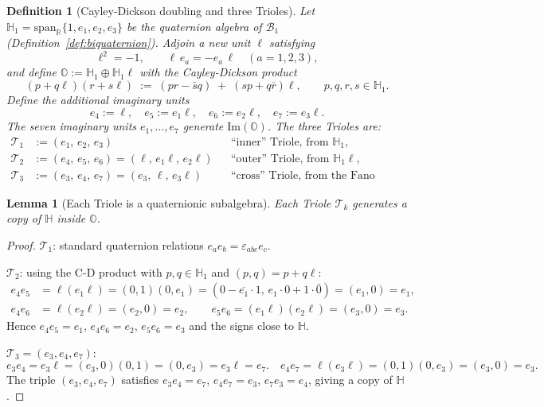 \documentclass[12pt,a4paper]{article}
\newtheorem{lemma}[theorem]{Lemma}
\newtheorem{definition}[theorem]{Definition}
\theoremstyle{remark}
\begin{document}
\begin{definition}[Cayley-Dickson doubling and three Trioles]
\label{def:three_trioles}
Let $\mathbb{H}_1=\mathrm{span}_{\mathbb{R}}\{1,e_1,e_2,e_3\}$ be the
quaternion algebra of $\mathcal{B}_1$ (Definition~\ref{def:biquaternion}).
Adjoin a new unit $\ell$ satisfying
\[
  \ell^2=-1,\qquad
  \ell\,e_a = -e_a\,\ell\quad(a=1,2,3),
\]
and define $\mathbb{O}:=\mathbb{H}_1\oplus\mathbb{H}_1\ell$ with
the Cayley-Dickson product
\[
  (p+q\ell)(r+s\ell) \;:=\; (pr-\bar{s}q)\;+\;(sp+q\bar{r})\ell,
  \qquad p,q,r,s\in\mathbb{H}_1.
\]
Define the additional imaginary units
\[
  e_4:=\ell,\quad
  e_5:=e_1\ell,\quad
  e_6:=e_2\ell,\quad
  e_7:=e_3\ell.
\]
The seven imaginary units $e_1,\ldots,e_7$ generate $\mathrm{Im}(\mathbb{O})$.
The three \emph{Trioles} are:
\begin{align*}
  \mathcal{T}_1 &:= (e_1,\,e_2,\,e_3)
    && \text{``inner'' Triole, from }\mathbb{H}_1,\\
  \mathcal{T}_2 &:= (e_4,\,e_5,\,e_6) = (\ell,\,e_1\ell,\,e_2\ell)
    && \text{``outer'' Triole, from }\mathbb{H}_1\ell,\\
  \mathcal{T}_3 &:= (e_3,\,e_4,\,e_7) = (e_3,\,\ell,\,e_3\ell)
    && \text{``cross'' Triole, from the Fano plane.}
\end{align*}
\end{definition}

\begin{lemma}[Each Triole is a quaternionic subalgebra]\label{lem:trioles_quaternionic}
Each Triole $\mathcal{T}_k$ generates a copy of $\mathbb{H}$ inside $\mathbb{O}$.
\end{lemma}
\begin{proof}
$\mathcal{T}_1$: standard quaternion relations $e_ae_b=\varepsilon_{abc}e_c$. \checkmark

$\mathcal{T}_2$: using the C-D product with $p,q\in\mathbb{H}_1$
and $(p,q)=p+q\ell$:
\begin{align*}
e_4 e_5 &= \ell(e_1\ell) = (0,1)(0,e_1)
  = (0-\overline{e_1}\cdot1,\,e_1\cdot0+1\cdot\bar{0})
  = (e_1,0) = e_1,\\
e_4 e_6 &= \ell(e_2\ell) = (e_2,0)=e_2,\qquad
e_5 e_6 = (e_1\ell)(e_2\ell) = (e_3,0)=e_3.
\end{align*}
Hence $e_4e_5=e_1$, $e_4e_6=e_2$, $e_5e_6=e_3$ and the signs close to $\mathbb{H}$.

$\mathcal{T}_3 = (e_3,e_4,e_7)$:
\[
  e_3 e_4 = e_3\ell = (e_3,0)(0,1)=(0,e_3)=e_3\ell=e_7. \quad
  e_4 e_7 = \ell(e_3\ell)=(0,1)(0,e_3)=(e_3,0)=e_3.
\]
The triple $(e_3,e_4,e_7)$ satisfies $e_3e_4=e_7$, $e_4e_7=e_3$,
$e_7e_3=e_4$, giving a copy of $\mathbb{H}$.
\end{proof}
\end{document}
